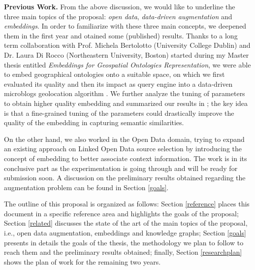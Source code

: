 \bigbreak
\textbf{Previous Work.} From the above discussion, we would like to underline the three main topics of the proposal: \textit{open data}, \textit{data-driven augmentation} and \textit{embeddings}. In order to familiarize with these three main concepts, we deepened them in the first year and otained some (published) results. Thanks to a long term collaboration with Prof. Michela Bertolotto (University College Dublin) and Dr. Laura Di Rocco (Northeastern University, Boston) started during my Master thesis entitled \textit{Embeddings for Geospatial Ontologies Representation}, we were able to embed geographical ontologies onto a suitable space, on which we first evaluated its quality \cite{dassereto2019evaluating} and then its impact as query engine into a data-driven microblogs geolocation algorithm \cite{di2020sherloc}. We further analyze the tuning of parameters to obtain higher quality embedding and summarized our results in \cite{dassereto2020tuning}; the key idea is that a fine-grained tuning of the parameters could drastically improve the quality of the embedding in capturing semantic similarities.

On the other hand, we also worked in the Open Data domain, trying to expand an existing approach on Linked Open Data source selection \cite{beyza2019linked} by introducing the concept of embedding to better associate context information. The work is in its conclusive part as the experimentation is going through and will be ready for submission soon. A discussion on the preliminary results obtained regarding the augmentation problem can be found in Section \ref{goals}.

The outline of this proposal is organized as follows: Section \ref{reference} places this document in a specific reference area and highlights the goals of the proposal; Section \ref{related} discusses the state of the art of the main topics of the proposal, i.e., open data augmentation, embeddings and knowledge graphs; Section \ref{goals} presents in details the goals of the thesis, the methodology we plan to follow to reach them and the preliminary results obtained; finally, Section \ref{researchplan} shows the plan of work for the remaining two years. 
\bigbreak 


